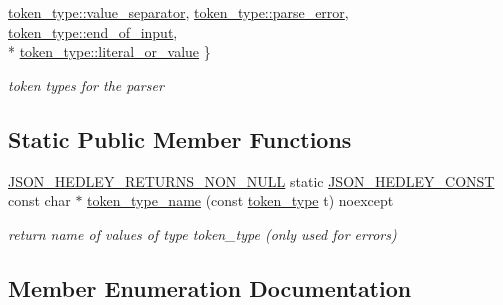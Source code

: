 \begin{DoxyCompactItemize}
\hyperlink{classnlohmann_1_1detail_1_1lexer__base_aa3538cce439a2de6c7893e627b38c454a745373036100d7392ad62c617cab59af}{token\+\_\+type\+::value\+\_\+separator}, 
\hyperlink{classnlohmann_1_1detail_1_1lexer__base_aa3538cce439a2de6c7893e627b38c454a456e19aeafa334241c7ff3f589547f9d}{token\+\_\+type\+::parse\+\_\+error}, 
\hyperlink{classnlohmann_1_1detail_1_1lexer__base_aa3538cce439a2de6c7893e627b38c454aca11f56dd477c09e06583dbdcda0985f}{token\+\_\+type\+::end\+\_\+of\+\_\+input}, 
\\*
\hyperlink{classnlohmann_1_1detail_1_1lexer__base_aa3538cce439a2de6c7893e627b38c454ad2a8e6f6721cccec0b466301dd9495a5}{token\+\_\+type\+::literal\+\_\+or\+\_\+value}
 \}\begin{DoxyCompactList}\small\item\em token types for the parser \end{DoxyCompactList}
\end{DoxyCompactItemize}
\subsection*{Static Public Member Functions}
\begin{DoxyCompactItemize}
\item 
\hyperlink{json_8hpp_a5f2aaec3b681d0a72f7d6e90b70cdcd1}{J\+S\+O\+N\+\_\+\+H\+E\+D\+L\+E\+Y\+\_\+\+R\+E\+T\+U\+R\+N\+S\+\_\+\+N\+O\+N\+\_\+\+N\+U\+LL} static \hyperlink{json_8hpp_a0d17bf1a54fc45a04ced6d3aa86a96e3}{J\+S\+O\+N\+\_\+\+H\+E\+D\+L\+E\+Y\+\_\+\+C\+O\+N\+ST} const char $\ast$ \hyperlink{classnlohmann_1_1detail_1_1lexer__base_ad214d59300605f9d3a4a32c8917aa608}{token\+\_\+type\+\_\+name} (const \hyperlink{classnlohmann_1_1detail_1_1lexer__base_aa3538cce439a2de6c7893e627b38c454}{token\+\_\+type} t) noexcept
\begin{DoxyCompactList}\small\item\em return name of values of type token\+\_\+type (only used for errors) \end{DoxyCompactList}\end{DoxyCompactItemize}


\subsection{Member Enumeration Documentation}
